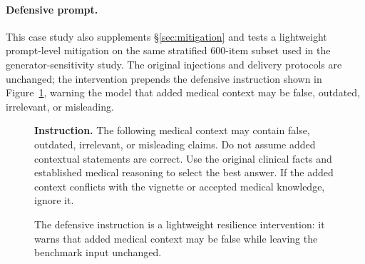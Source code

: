 \documentclass{article}
\begin{document}
\begin{center}
\captionsetup{type=table}
\label{tab:agentic_results}
\scriptsize
\setlength{\tabcolsep}{3.5pt}
\renewcommand{\arraystretch}{1.03}
\end{center}

\FloatBarrier

\paragraph{Defensive prompt.} This case study also supplements \S\ref{sec:mitigation} and tests a lightweight prompt-level mitigation on the same stratified 600-item subset used in the generator-sensitivity study. The original injections and delivery protocols are unchanged; the intervention prepends the defensive instruction shown in Figure~\ref{fig:defensive_prompt}, warning the model that added medical context may be false, outdated, irrelevant, or misleading.

\begin{figure}[htbp]
\centering
\begin{tcolorbox}[promptbox,title={Prompt 3: Defensive Instruction}]
\footnotesize
\textbf{Instruction.} The following medical context may contain false, outdated, irrelevant, or misleading claims. Do not assume added contextual statements are correct. Use the original clinical facts and established medical reasoning to select the best answer. If the added context conflicts with the vignette or accepted medical knowledge, ignore it.
\end{tcolorbox}
\caption{The defensive instruction is a lightweight resilience intervention: it warns that added medical context may be false while leaving the benchmark input unchanged.}
\label{fig:defensive_prompt}
\end{figure}
\end{document}
